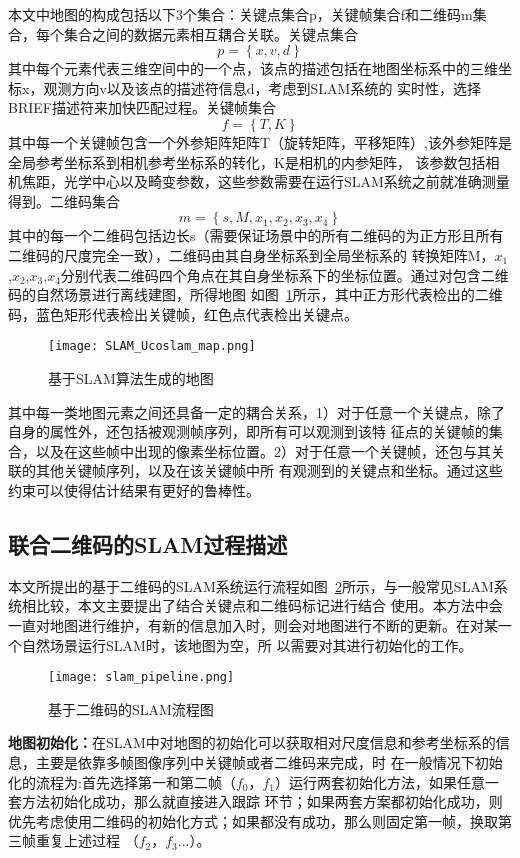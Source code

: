 本文中地图的构成包括以下3个集合：关键点集合p，关键帧集合f和二维码m集合，每个集合之间的数据元素相互耦合关联。关键点集合
\begin{equation}p = \left\{x,v,d\right\}\end{equation}
其中每个元素代表三维空间中的一个点，该点的描述包括在地图坐标系中的三维坐标x，观测方向v以及该点的描述符信息d，考虑到SLAM系统的
实时性，选择BRIEF描述符来加快匹配过程。关键帧集合
\begin{equation}f = \left\{T,K\right\}\end{equation}
其中每一个关键帧包含一个外参矩阵矩阵T（旋转矩阵，平移矩阵）,该外参矩阵是全局参考坐标系到相机参考坐标系的转化，K是相机的内参矩阵，
该参数包括相机焦距，光学中心以及畸变参数，这些参数需要在运行SLAM系统之前就准确测量得到。二维码集合
\begin{equation}m = \left\{s,M,x_1,x_2,x_3,x_4\right\}\end{equation}
其中的每一个二维码包括边长s（需要保证场景中的所有二维码的为正方形且所有二维码的尺度完全一致），二维码由其自身坐标系到全局坐标系的
转换矩阵M，$x_1$,$x_2$,$x_3$,$x_4$分别代表二维码四个角点在其自身坐标系下的坐标位置。通过对包含二维码的自然场景进行离线建图，所得地图
如图~\ref{fig:Ucoslam_map}所示，其中正方形代表检出的二维码，蓝色矩形代表检出关键帧，红色点代表检出关键点。
\begin{figure}[H] %
  \centering
  \texttt{[image: SLAM\_Ucoslam\_map.png]}
  \caption{基于SLAM算法生成的地图}
  \label{fig:Ucoslam_map}
\end{figure}

其中每一类地图元素之间还具备一定的耦合关系，1）对于任意一个关键点，除了自身的属性外，还包括被观测帧序列，即所有可以观测到该特
征点的关键帧的集合，以及在这些帧中出现的像素坐标位置。2）对于任意一个关键帧，还包与其关联的其他关键帧序列，以及在该关键帧中所
有观测到的关键点和坐标。通过这些约束可以使得估计结果有更好的鲁棒性。

\subsection{联合二维码的SLAM过程描述}
\label{sec:2.3.3}
本文所提出的基于二维码的SLAM系统运行流程如图~\ref{fig:slam_pipeline}所示，与一般常见SLAM系统相比较，本文主要提出了结合关键点和二维码标记进行结合
使用。本方法中会一直对地图进行维护，有新的信息加入时，则会对地图进行不断的更新。在对某一个自然场景运行SLAM时，该地图为空，所
以需要对其进行初始化的工作。
\begin{figure}[H] %
  \centering
  \texttt{[image: slam\_pipeline.png]}
  \caption{基于二维码的SLAM流程图}
  \label{fig:slam_pipeline}
\end{figure}
\textbf{地图初始化：}在SLAM中对地图的初始化可以获取相对尺度信息和参考坐标系的信息，主要是依靠多帧图像序列中关键帧或者二维码来完成，时
在一般情况下初始化的流程为:首先选择第一和第二帧（$f_0$，$f_1$）运行两套初始化方法，如果任意一套方法初始化成功，那么就直接进入跟踪
环节；如果两套方案都初始化成功，则优先考虑使用二维码的初始化方式；如果都没有成功，那么则固定第一帧，换取第三帧重复上述过程
（$f_2$，$f_3$...）。

